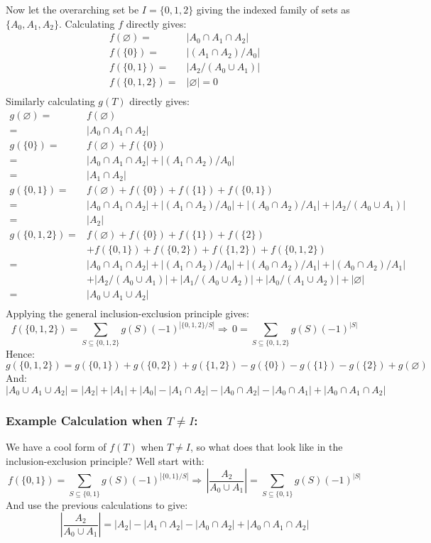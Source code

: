 Now let the overarching set be $I = \{0,1,2\}$ giving the indexed family of sets as $\{A_0,A_1,A_2\}$.
Calculating $f$ directly gives:
\begin{equation*}
\begin{aligned}
	f(\varnothing) =& |A_0 \cap A_1\cap A_2|\\
	f(\{0\}) =& |(A_1 \cap A_2)/A_0|\\ 
	f(\{0,1\}) =& |A_2/(A_0\cup A_1)|\\ 
	f(\{0,1,2\}) =& |\varnothing| = 0\\ 
\end{aligned}
\end{equation*}
Similarly calculating $g(T)$ directly gives:
\begin{equation*}
\begin{aligned}
	g(\varnothing) =& f(\varnothing) \\
	=& |A_0\cap A_1 \cap A_2|\\
	g(\{0\}) =& f(\varnothing) + f(\{0\})\\
	=& |A_0 \cap A_1 \cap A_2| + |(A_1\cap A_2)/A_0|\\
	=& |A_1\cap A_2|\\
	g(\{0,1\}) =& f(\varnothing) + f(\{0\})+f(\{1\})+f(\{0,1\})\\
	=& |A_0 \cap A_1\cap A_2| + |(A_1\cap A_2)/A_0|+|(A_0\cap A_2)/A_1|+|A_2/(A_0\cup A_1)|\\
	=& |A_2|\\
	g(\{0,1,2\}) =& f(\varnothing) + f(\{0\})+f(\{1\})+f(\{2\})\\
	&+f(\{0,1\})+f(\{0,2\})+f(\{1,2\})+f(\{0,1,2\})\\
	=& |A_0 \cap A_1\cap A_2| + |(A_1\cap A_2)/A_0|+|(A_0\cap A_2)/A_1|+|(A_0\cap A_2)/A_1|\\
	&+|A_2/(A_0\cup A_1)|+|A_1/(A_0\cup A_2)|+|A_0/(A_1\cup A_2)|+|\varnothing|\\
	=& |A_0\cup A_1\cup A_2|\\
\end{aligned}
\end{equation*}
Applying the general inclusion-exclusion principle gives:
\[f(\{0,1,2\}) = \sum_{S\subseteq \{0,1,2\}}g(S)(-1)^{|\{0,1,2\}/S|} \Rightarrow\,0= \sum_{S\subseteq \{0,1,2\}}g(S)(-1)^{|S|}\]
Hence:
\[g(\{0,1,2\})=g(\{0,1\})+g(\{0,2\})+g(\{1,2\})-g(\{0\})-g(\{1\})-g(\{2\})+g(\varnothing)\]
And:
\[|A_0\cup A_1\cup A_2|= |A_2|+|A_1|+|A_0|-|A_1\cap A_2|-|A_0\cap A_2|-|A_0\cap A_1|+|A_0\cap A_1\cap A_2|\]

\subsubsection{Example Calculation when $T\neq I$:}
We have a cool form of $f(T)$ when $T\neq I$,
so what does that look like in the inclusion-exclusion principle?
Well start with:
\[f(\{0,1\}) = \sum_{S\subseteq \{0,1\}}g(S)(-1)^{|\{0,1\}/S|} \Rightarrow\,\left|\frac{A_2}{A_0\cup A_1}\right|= \sum_{S\subseteq \{0,1\}}g(S)(-1)^{|S|}\]
And use the previous calculations to give:
\[\left|\frac{A_2}{A_0\cup A_1}\right| = |A_2|-|A_1\cap A_2|-|A_0\cap A_2|+|A_0\cap A_1\cap A_2|\]

